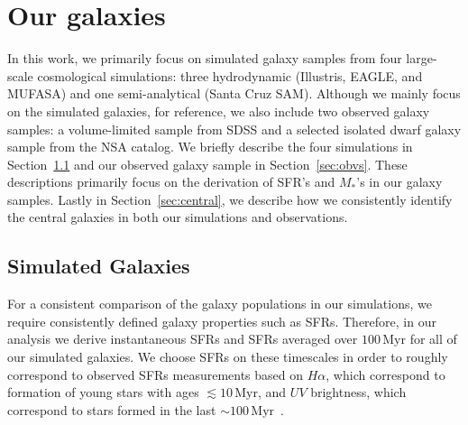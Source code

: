 \documentclass[preprint2,tighten]{aastex62}
\begin{document}
\section{Our galaxies} \label{sec:ourgals}
In this work, we primarily focus on simulated galaxy samples from four 
large-scale cosmological simulations: three hydrodynamic (Illustris, EAGLE, 
and MUFASA) and one semi-analytical (Santa Cruz SAM). Although we mainly 
focus on the simulated galaxies, for reference, we also include two observed 
galaxy samples: a volume-limited sample from SDSS and a selected isolated 
dwarf galaxy sample from the NSA catalog. We briefly describe the four 
simulations in Section~\ref{sec:galsims} and our observed galaxy sample 
in Section~\ref{sec:obvs}. These descriptions primarily focus on the 
derivation of SFR's and $M_*$'s in our galaxy samples. Lastly in 
Section~\ref{sec:central}, we describe how we consistently identify the 
central galaxies in both our simulations and observations. 

\subsection{Simulated Galaxies} \label{sec:galsims}
For a consistent comparison of the galaxy populations in our simulations,
we require consistently defined galaxy properties such as SFRs. Therefore,  
in our analysis we derive instantaneous SFRs and SFRs averaged over 
$100\,\mathrm{Myr}$ for all of our simulated galaxies. We choose SFRs on 
these timescales in order to roughly correspond to observed SFRs 
measurements based on $H{\alpha}$, which correspond to formation of young 
stars with ages $\lesssim 10\,\mathrm{Myr}$, and $UV$ brightness, which 
correspond to stars formed in the last 
$\sim 100\,\mathrm{Myr}$~\citep[e.g.][]{kennicutt2012}. 
\end{document}
